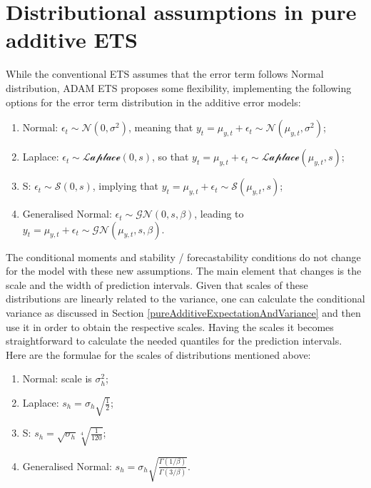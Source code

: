 \documentclass[]{book}
\providecommand{\tightlist}{%
  \setlength{\itemsep}{0pt}\setlength{\parskip}{0pt}}
\theoremstyle{definition}
\theoremstyle{definition}
\theoremstyle{definition}
\theoremstyle{definition}
\theoremstyle{remark}
\begin{document}
\hypertarget{ADAMETSAdditiveDistributions}{%
\section{Distributional assumptions in pure additive ETS}\label{ADAMETSAdditiveDistributions}}

While the conventional ETS assumes that the error term follows Normal distribution, ADAM ETS proposes some flexibility, implementing the following options for the error term distribution in the additive error models:

\begin{enumerate}
\def\labelenumi{\arabic{enumi}.}
\tightlist
\item
  Normal: \(\epsilon_t \sim \mathcal{N}(0, \sigma^2)\), meaning that \(y_t = \mu_{y,t} + \epsilon_t \sim \mathcal{N}(\mu_{y,t}, \sigma^2)\);
\item
  Laplace: \(\epsilon_t \sim \mathcal{Laplace}(0, s)\), so that \(y_t = \mu_{y,t} + \epsilon_t \sim \mathcal{Laplace}(\mu_{y,t}, s)\);
\item
  S: \(\epsilon_t \sim \mathcal{S}(0, s)\), implying that \(y_t = \mu_{y,t} + \epsilon_t \sim \mathcal{S}(\mu_{y,t}, s)\);
\item
  Generalised Normal: \(\epsilon_t \sim \mathcal{GN}(0, s, \beta)\), leading to \(y_t = \mu_{y,t} + \epsilon_t \sim \mathcal{GN}(\mu_{y,t}, s, \beta)\).
\end{enumerate}

The conditional moments and stability / forecastability conditions do not change for the model with these new assumptions. The main element that changes is the scale and the width of prediction intervals. Given that scales of these distributions are linearly related to the variance, one can calculate the conditional variance as discussed in Section \ref{pureAdditiveExpectationAndVariance} and then use it in order to obtain the respective scales. Having the scales it becomes straightforward to calculate the needed quantiles for the prediction intervals. Here are the formulae for the scales of distributions mentioned above:

\begin{enumerate}
\def\labelenumi{\arabic{enumi}.}
\tightlist
\item
  Normal: scale is \(\sigma^2_h\);
\item
  Laplace: \(s_h = \sigma_h \sqrt{\frac{1}{2}}\);
\item
  S: \(s_h = \sqrt{\sigma_h}\sqrt[4]{\frac{1}{120}}\);
\item
  Generalised Normal: \(s_h = \sigma_h \sqrt{\frac{\Gamma(1/\beta)}{\Gamma(3/\beta)}}\).
\end{enumerate}
\end{document}
